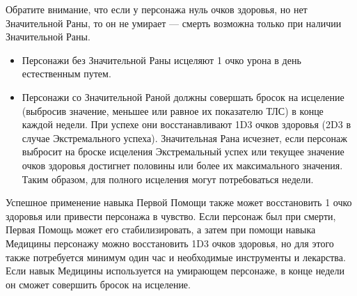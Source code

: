 \documentclass[letterpaper,twocolumn,openany, twoside, 11pt, usenames]{cocbook}
\begin{document}
Обратите внимание, что если у персонажа нуль очков здоровья, но нет Значительной Раны, то он не умирает --- смерть возможна только при наличии Значительной Раны.

\begin{itemize}[leftmargin=4mm]
  \item Персонажи без Значительной Раны исцеляют 1 очко урона в день естественным путем.
  \item Персонажи со Значительной Раной должны совершать бросок на исцеление (выбросив значение, меньшее или равное их показателю ТЛС) в конце каждой недели. При успехе они восстанавливают 1D3 очков здоровья (2D3 в случае Экстремального успеха). Значительная Рана исчезнет, если персонаж выбросит на броске исцеления Экстремальный успех или текущее значение очков здоровья достигнет половины или более их максимального значения. Таким образом, для полного исцеления могут потребоваться недели.
\end{itemize}

Успешное применение навыка Первой Помощи также может восстановить 1 очко здоровья или привести персонажа в чувство. Если персонаж был при смерти, Первая Помощь может его стабилизировать, а затем при помощи навыка Медицины персонажу можно восстановить 1D3 очков здоровья, но для этого также потребуется минимум один час и необходимые инструменты и лекарства. Если навык Медицины используется на умирающем персонаже, в конце недели он сможет совершить бросок на исцеление.

\smallbreak
\noindent {}
\end{document}
